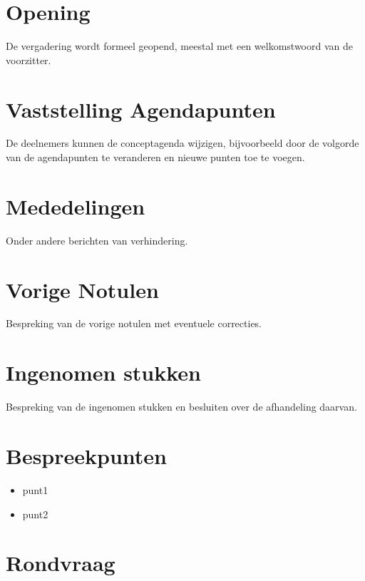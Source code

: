 \documentclass[dutch]{hu}
\subtitle{Agenda Teamvergadering datum}
\begin{document}
\maketitle
\chapter{Opening}
De vergadering wordt formeel geopend, meestal met een welkomstwoord van de voorzitter.

\chapter{Vaststelling Agendapunten}
De deelnemers kunnen de conceptagenda wijzigen, bijvoorbeeld door de volgorde van de agendapunten te veranderen en nieuwe punten toe te voegen.

\chapter{Mededelingen}
Onder andere berichten van verhindering.

\chapter{Vorige Notulen}
Bespreking van de vorige notulen met eventuele correcties.

\chapter{Ingenomen stukken}
Bespreking van de ingenomen stukken en besluiten over de afhandeling daarvan.

\chapter{Bespreekpunten}
\begin{itemize}
\item punt1
\item punt2
\end{itemize}

\chapter{Rondvraag}
\end{document}
